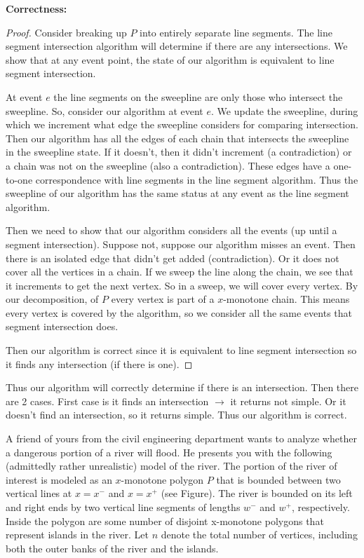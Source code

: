 \documentclass[11pt]{article}
\begin{document}
\textbf{Correctness:}

\begin{proof}
    Consider breaking up $P$ into entirely separate line segments. 
    The line segment intersection algorithm will determine if there are any intersections.
    We show that at any event point, the state of our algorithm is equivalent to line segment intersection.

    At event $e$ the line segments on the sweepline are only those who intersect the sweepline.
    So, consider our algorithm at event $e$. We update the sweepline,
    during which we increment what edge the sweepline considers for comparing intersection. 
    Then our algorithm has all the edges of each chain that intersects the sweepline in the sweepline state.
    If it doesn't, then it didn't increment (a contradiction) or a chain was not on the sweepline (also a contradiction).
    These edges have a one-to-one correspondence with line segments in the line segment algorithm.
    Thus the sweepline of our algorithm has the same status at any event as the line segment algorithm.

    Then we need to show that our algorithm considers all the events (up until a segment intersection).
    Suppose not, suppose our algorithm misses an event. Then there is an isolated edge that didn't get added (contradiction).
    Or it does not cover all the vertices in a chain. If we sweep the line along the chain, we see that it 
    increments to get the next vertex. So in a sweep, we will cover every vertex. By our decomposition, of $P$
    every vertex is part of a $x$-monotone chain. This means every vertex is covered by the algorithm,
    so we consider all the same events that segment intersection does. 

    Then our algorithm is correct since it is equivalent to line segment intersection so it finds any intersection (if there is one).
\end{proof}

Thus our algorithm will correctly determine if there is an intersection. Then there are 2 cases.
First case is it finds an intersection $\rightarrow$ it returns not simple. Or it doesn't find an intersection, so
it returns simple. Thus our algorithm is correct.









A friend of yours from the civil engineering department wants to analyze whether
a dangerous portion of a river will flood. He presents you with the following
(admittedly rather unrealistic) model of the river. The portion of the river of
interest is modeled as an $x$-monotone polygon $P$ that is bounded between two
vertical lines at $x = x^-$ and $x = x^+$ (see Figure). The river is bounded on
its left and right ends by two vertical line segments of lengths $w^-$ and
$w^+$, respectively. Inside the polygon are some number of disjoint x-monotone
polygons that represent islands in the river.  Let $n$ denote the total number
of vertices, including both the outer banks of the river and the islands.
\end{document}
